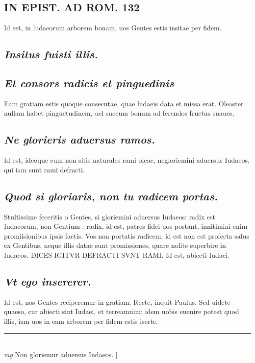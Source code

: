 \documentclass{article}
\begin{document}
\begin{pages}
\section*{IN EPIST. AD ROM.  132 }
\marginpar{[ p.]}\pstart Id est, in ludaeorum arborem bonam, uos Gentes estis insitae per fidem.  \pend
{}
{}
\subsection*{\textit{Insitus fuisti illis. }}
{}
\subsection*{\textit{Et consors radicis et pinguedinis }}\pstart Eam gratiam estis quoque consecutae, quae ludaeis data et missa erat. Oleaster nullam habet pinguetudinem, uel succum bonum ad ferendos fructus suaues,  \pend
{}
{}
\subsection*{\textit{Ne glorieris aduersus ramos. }}\pstart Id est, ideoque cum non sitis naturales rami oleae, negloriemini aduersus Iudaeos, qui iam sunt rami defracti.  \pend
{}
{}
\subsection*{\textit{Quod si gloriaris, non tu radicem portas. }}\pstart Stultissime feceritis o Gentes, si gloriemini aduersus Iudaeos: radix est Iudaeorum, non Gentium : radix, id est, patres fidei uos portant, innitimini enim promiisionibus ipsis factis. Vos non portatis radicem, id est non est profecta salus ex Gentibus, neque illis datae sunt promissiones, quare nolite superbire in Iudaeos.  DICES IGITVR DEFRACTI SVNT RAMI. Id est, abiecti Iudaei.  \pend
{}
{}
\subsection*{\textit{Vt ego insererer. }}\pstart Id est, nos Gentes reciperemur in gratiam. Recte, inquit Paulus. Sed uidete quaeso, cur abiecti sint Iudaei, et terreamnini: idem uobis euenire potest quod illis, iam uos in eam arborem per fidem estis iserte.  \pend
\vspace{0.5cm}\noindent
\vspace{0.2cm}\rule{1cm}{0.2pt}\\ 
\hspace{0.2cm}\textit{mg}
\footnotesize Non gloriemur aduersus Iudaeos.  
\normalsize| 

\end{pages}
\end{document}
